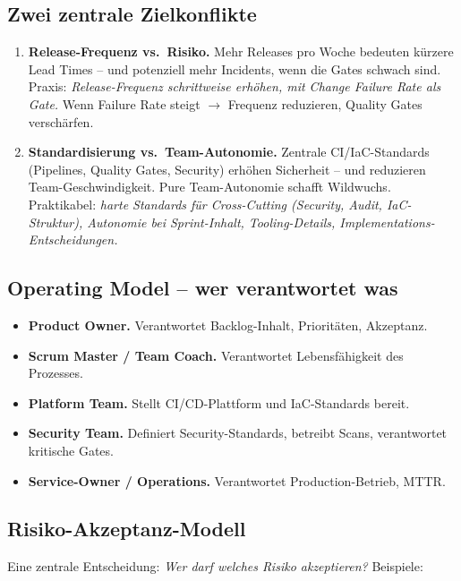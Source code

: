 \documentclass[11pt,a4paper,oneside]{article}
\newcommand{\fachbegriff}[1]{\textbf{#1}}
\begin{document}
\subsection{Zwei zentrale Zielkonflikte}

\begin{enumerate}
  \item \textbf{Release-Frequenz vs.\ Risiko.} Mehr Releases pro Woche bedeuten kürzere Lead Times -- und potenziell mehr Incidents, wenn die Gates schwach sind. Praxis: \emph{Release-Frequenz schrittweise erhöhen, mit Change Failure Rate als Gate.} Wenn Failure Rate steigt $\rightarrow$ Frequenz reduzieren, Quality Gates verschärfen.
  \item \textbf{Standardisierung vs.\ Team-Autonomie.} Zentrale CI/IaC-Standards (Pipelines, Quality Gates, Security) erhöhen Sicherheit -- und reduzieren Team-Geschwindigkeit. Pure Team-Autonomie schafft Wildwuchs. Praktikabel: \emph{harte Standards für Cross-Cutting (Security, Audit, IaC-Struktur), Autonomie bei Sprint-Inhalt, Tooling-Details, Implementations-Entscheidungen.}
\end{enumerate}

\subsection{Operating Model -- wer verantwortet was}

\begin{itemize}
  \item \fachbegriff{Product Owner.} Verantwortet Backlog-Inhalt, Prioritäten, Akzeptanz.
  \item \fachbegriff{Scrum Master / Team Coach.} Verantwortet Lebensfähigkeit des Prozesses.
  \item \fachbegriff{Platform Team.} Stellt CI/CD-Plattform und IaC-Standards bereit.
  \item \fachbegriff{Security Team.} Definiert Security-Standards, betreibt Scans, verantwortet kritische Gates.
  \item \fachbegriff{Service-Owner / Operations.} Verantwortet Production-Betrieb, MTTR.
\end{itemize}

\subsection{Risiko-Akzeptanz-Modell}

Eine zentrale Entscheidung: \emph{Wer darf welches Risiko akzeptieren?} Beispiele:
\end{document}
